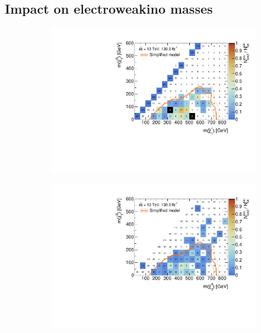 \subsection{Impact on electroweakino masses}\label{sec:impact_electroweakino_masses}

 \begin{figure}
	\centering
	\captionsetup[subfigure]{aboveskip=-1pt,belowskip=-1pt}
	\begin{subfigure}[b]{0.5\linewidth}
		\centering\includegraphics[width=\textwidth]{cut_none/mchi1p_mlsp_contour}
		\caption{\label{fig:mchi1p_mlsp_contour}}
	\end{subfigure}\hfill
	\begin{subfigure}[b]{0.5\linewidth}
		\centering\includegraphics[width=\textwidth]{cut_none/mchi20_mlsp_contour}
		\caption{\label{fig:mchi20_mlsp_contour}}

\end{subfigure}
\end{figure}

